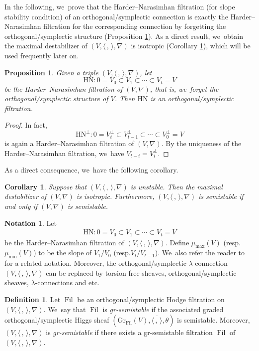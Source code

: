\documentclass[11pt]{article}
\newcommand{\resp}{resp.\xspace}
\newcommand{\skpt}{\smallskip}
\numberwithin{equation}{section}
\newcommand{\lconnection}{$\lambda$\nobreakdash-con\-nec\-tion\xspace}
\newcommand{\lconnections}{$\lambda$\nobreakdash-con\-nec\-tions\xspace}
\newcommand{\grsemistable}{gr\nobreakdash-semi\-stable\xspace}
\newcommand{\HN}{\mathrm{HN}}
\DeclareMathOperator{\Filt}{Fil}
\newcommand{\Gr}{\mathrm{Gr}}
\theoremstyle{plain}
\newtheorem{cor}[thm]{Corollary}
\newtheorem{prop}[thm]{Proposition}
\theoremstyle{definition}
\newtheorem{defn}[thm]{Definition}
\newtheorem{notn}[thm]{Notation}
\begin{document}
In the following, we~prove that the Harder--Narasimhan filtration (for slope stability condition) of an orthogonal/symplectic connection is exactly the Harder--Narasimhan filtration for the corresponding connection by forgetting the orthogonal/symplectic structure (Proposition \ref{prop_HN_fil}). As a direct result, we~obtain the maximal destabilizer of $(V, \langle \,,\, \rangle, \nabla)$ is isotropic (Corollary \ref{cor_max_destab_iso}), which will be used frequently later on.

\begin{prop}\label{prop_HN_fil}
Given a triple $(V,\langle \,, \, \rangle,\nabla)$, let
\[
\HN:0=V_0\subset V_1 \subset \cdots \subset V_t=V
\]
be the Harder--Narasimhan filtration of $(V, \nabla)$, that is, we~forget the orthogonal/symplectic structure of $V$. Then $\HN$ is an orthogonal/symplectic filtration.
\end{prop}

\begin{proof}
In fact,
\[
\HN^\perp:0=V_t^\perp\subset V_{t-1}^\perp \subset \cdots \subset V_0^\perp=V
\]
is again a Harder--Narasimhan filtration of $(V, \nabla)$. By the uniqueness of the Harder--Narasimhan filtration, we~have $V_{t-i}=V_{i}^\perp$.
\end{proof}

As a direct consequence, we~have the following corollary.
\begin{cor}\label{cor_max_destab_iso}
Suppose that $(V,\langle \,, \, \rangle,\nabla)$ is unstable. Then the maximal destabilizer of $(V, \nabla)$ is isotropic. Furthermore, $(V,\langle \,, \, \rangle,\nabla)$ is semistable if and only if $(V, \nabla)$ is semistable.
\end{cor}

\begin{notn}
Let
\begin{align*}
\HN:0=V_0\subset V_1 \subset \cdots \subset V_t=V
\end{align*}
be the Harder--Narasimhan filtration of $(V,\langle \,, \, \rangle,\nabla)$. Define $\mu_{\max}(V)$ (\resp $\mu_{\min}(V)$) to be the slope of $V_1 / V_0$ (\resp $V_t/V_{t-1}$). We~also refer the reader to \cite[Def.\,1.3.2]{HL97} for a related notation. Moreover, the orthogonal/symplectic \lconnection $(V,\langle \,, \, \rangle,\nabla)$ can be replaced by torsion free sheaves, orthogonal/symplectic sheaves, \lconnections and etc.
\end{notn}

\skpt
\begin{defn} \label{gr-semistable}
Let $\Filt$ be an orthogonal/symplectic Hodge filtration on $(V, \langle \,,\, \rangle,\nabla)$. We~say that $\Filt$ is \emph{\grsemistable} if the associated graded orthogonal/sym\-plec\-tic Higgs sheaf $(\Gr_{\Filt}(V), \overline{\langle \,, \, \rangle},\theta)$ is semistable. Moreover, $(V, \langle \,, \, \rangle, \nabla)$ is \emph{\grsemistable} if there exists a \grsemistable filtration $\Filt$ of $(V, \langle \,,\, \rangle,\nabla)$.
\end{defn}
\end{document}
